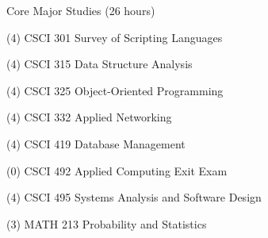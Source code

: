 \begin{reqgroup}{Core Major Studies (26 hours)}
\begin{checklist}
\begin{minipage}{0.5\linewidth}
	\item (4) CSCI 301	Survey of Scripting Languages
	\item (4) CSCI 315	Data Structure Analysis
	\item (4) CSCI 325	Object-Oriented Programming
	\item (4) CSCI 332	Applied Networking
\end{minipage}
\begin{minipage}{0.5\linewidth}
	\item (4) CSCI 419	Database Management
	\item (0) CSCI 492	Applied Computing Exit Exam
	\item (4) CSCI 495	Systems Analysis and Software Design
	\item (3) MATH 213	Probability and Statistics
	\end{minipage}
\end{checklist}
\end{reqgroup}

